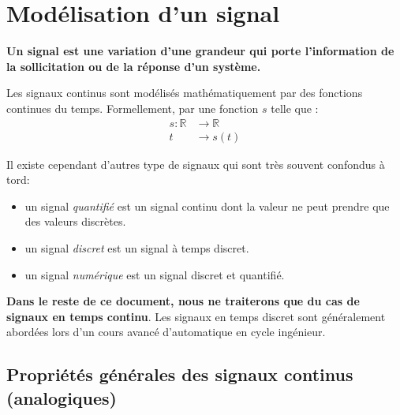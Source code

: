 \section{Modélisation d'un signal}
\textbf{Un signal est une variation d'une grandeur qui porte l'information 
de la sollicitation ou de la réponse d'un système.}

Les signaux continus sont modélisés mathématiquement par des fonctions 
continues du temps. Formellement, par une fonction $s$ telle que :
\begin{align*}
s : \mathbb{R}&\rightarrow\mathbb{R} \\  
t&\rightarrow s(t) 
\end{align*}    

Il existe cependant d'autres type de signaux qui sont très souvent confondus 
à tord:
\begin{itemize}
    \item un signal \emph{quantifié} est un signal continu 
          dont la valeur ne peut prendre que des valeurs discrètes. 
    \item un signal \emph{discret} est un signal à temps discret.
    \item un signal \emph{numérique} est un signal discret et quantifié.   
\end{itemize}

\textbf{Dans le reste de ce document, nous ne traiterons que
du cas de signaux en temps continu}. Les signaux en temps discret
sont généralement abordées lors d'un cours 
avancé d'automatique en cycle ingénieur.

\subsection{Propriétés générales des signaux continus (analogiques)}

